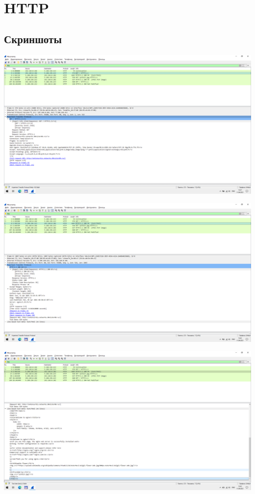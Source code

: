 
\section{HTTP}

\subsection{Скриншоты}

\begin{center}

    \includegraphics[width=\textwidth]{screenshots/http_get_text_request_1}

    \includegraphics[width=\textwidth]{screenshots/http_get_text_response_1}

    \includegraphics[width=\textwidth]{screenshots/http_get_text_response_2}


\end{center}
